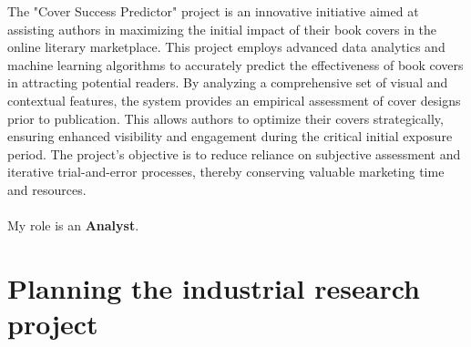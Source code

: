 \documentclass[12pt]{article}
\date{}
\begin{document}
\maketitle

The "Cover Success Predictor" project is an innovative initiative aimed at assisting authors in maximizing the initial impact of their book covers in the online literary marketplace. This project employs advanced data analytics and machine learning algorithms to accurately predict the effectiveness of book covers in attracting potential readers. By analyzing a comprehensive set of visual and contextual features, the system provides an empirical assessment of cover designs prior to publication. This allows authors to optimize their covers strategically, ensuring enhanced visibility and engagement during the critical initial exposure period. The project's objective is to reduce reliance on subjective assessment and iterative trial-and-error processes, thereby conserving valuable marketing time and resources.\\
~\\
My role is an \textbf{Analyst}.


\section{Planning the industrial research project}
\end{document}
